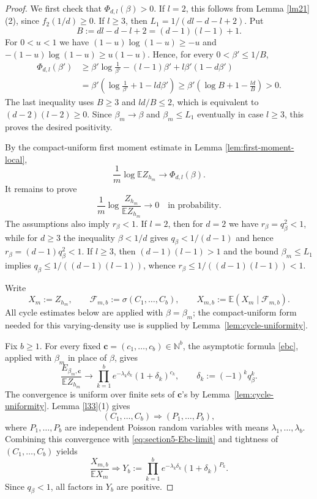 \documentclass[10pt,a4paper]{amsart}
\begin{document}
\begin{proof}
We first check that $\Phi_{d,l}(\beta)>0$.  If $l=2$, this follows from
Lemma \ref{lm21}(2), since $f_2(1/d)\ge0$.  If $l\ge3$, then
$L_1=1/(dl-d-l+2)$.  Put
\[
B:=dl-d-l+2=(d-1)(l-1)+1.
\]
For $0<u<1$ we have $(1-u)\log(1-u)\ge -u$ and
$-(1-u)\log(1-u)\ge u(1-u)$.  Hence, for every $0<\beta'\le 1/B$,
\begin{align*}
\Phi_{d,l}(\beta')
&\ge \beta'\log\frac1{\beta'}-(l-1)\beta'
   +l\beta'(1-d\beta') \\
&=\beta'\left(\log\frac1{\beta'}+1-ld\beta'\right)
\ge \beta'\left(\log B+1-\frac{ld}{B}\right)>0.
\end{align*}
The last inequality uses $B\ge3$ and $ld/B\le2$, which is equivalent to
$(d-2)(l-2)\ge0$.  Since $\beta_m\to\beta$ and $\beta_m\le L_1$ eventually in
case $l\ge3$, this proves the desired positivity.

By the compact-uniform first moment estimate in Lemma \ref{lem:first-moment-local},
\begin{equation}\label{eq:section5-first-moment-log}
  \frac1m\log \mathbb E Z_{h_m}\longrightarrow \Phi_{d,l}(\beta).
\end{equation}
It remains to prove
\begin{equation}\label{lmb}
  \frac1m\log\frac{Z_{h_m}}{\mathbb E Z_{h_m}}\longrightarrow0
  \quad\text{in probability}.
\end{equation}
The assumptions also imply $r_\beta<1$.  If $l=2$, then for $d=2$ we have
$r_\beta=q_\beta^2<1$, while for $d\ge3$ the inequality $\beta<1/d$ gives
$q_\beta<1/(d-1)$ and hence $r_\beta=(d-1)q_\beta^2<1$.  If $l\ge3$, then
$(d-1)(l-1)>1$ and the bound $\beta_m\le L_1$ implies
$q_\beta\le 1/((d-1)(l-1))$, whence
$r_\beta\le 1/((d-1)(l-1))<1$.

Write
\[
  X_m:=Z_{h_m},\qquad \mathcal F_{m,b}:=\sigma(C_1,\ldots,C_b),\qquad
  X_{m,b}:=\mathbb E(X_m\mid\mathcal F_{m,b}).
\]
All cycle estimates below are applied with $\beta=\beta_m$; the compact-uniform
form needed for this varying-density use is supplied by Lemma~\ref{lem:cycle-uniformity}.

Fix $b\ge1$.  For every fixed $\mathbf c=(c_1,\ldots,c_b)\in\mathbb N^b$, the
asymptotic formula \eqref{ebc}, applied with $\beta_m$ in place of $\beta$, gives
\begin{equation}\label{eq:section5-Ebc-limit}
  \frac{E_{\beta_m,\mathbf c}}{\mathbb E Z_{h_m}}
  \longrightarrow
  \prod_{k=1}^b e^{-\lambda_k\delta_k}(1+\delta_k)^{c_k},
  \qquad
  \delta_k:=(-1)^kq_\beta^k .
\end{equation}
The convergence is uniform over finite sets of $\mathbf c$'s by
Lemma~\ref{lem:cycle-uniformity}.  Lemma
\ref{l33}(1) gives
\[
  (C_1,\ldots,C_b)\Rightarrow (P_1,\ldots,P_b),
\]
where $P_1,\ldots,P_b$ are independent Poisson random variables with means
$\lambda_1,\ldots,\lambda_b$.  Combining this convergence with
\eqref{eq:section5-Ebc-limit} and tightness of $(C_1,\ldots,C_b)$ yields
\begin{equation}\label{eq:section5-Xmb-limit}
  \frac{X_{m,b}}{\mathbb E X_m}\Rightarrow
  Y_b:=\prod_{k=1}^b e^{-\lambda_k\delta_k}(1+\delta_k)^{P_k}.
\end{equation}
Since $q_\beta<1$, all factors in $Y_b$ are positive.


\end{proof}
\end{document}
